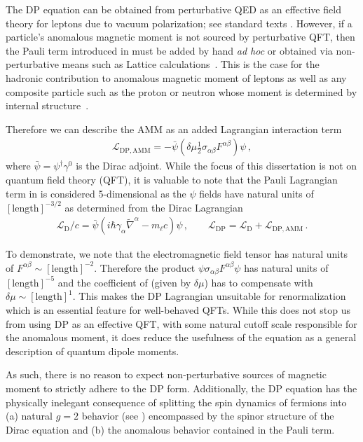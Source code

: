 The DP equation can be obtained from perturbative QED as an effective field theory for leptons due to vacuum polarization; see standard texts \cite{Itzykson:1980rh,Schwartz:2014sze}. However, if a particle's anomalous magnetic moment is not sourced by perturbative QFT, then the Pauli term introduced in  must be added by hand \emph{ad hoc} or obtained via non-perturbative means such as Lattice calculations~\citep{Aoyama:2020ynm}. This is the case for the hadronic contribution to anomalous magnetic moment of leptons as well as any composite particle such as the proton or neutron whose moment is determined by internal structure~\citep{Proceedings:2012ulb,Green:2015wqa}.

Therefore we can describe the AMM as an added Lagrangian interaction term
\begin{gather}
    \label{lamm:1}
    \mathcal{L}_\mathrm{DP,AMM} = -{\bar\psi}\left(\delta\mu\frac{1}{2}\sigma_{\alpha\beta}F^{\alpha\beta}\right)\psi\,,
\end{gather}
where ${\bar\psi}=\psi^{\dagger}\gamma^{0}$ is the Dirac adjoint. While the focus of this dissertation is not on quantum field theory (QFT), it is valuable to note that the Pauli Lagrangian term in  is considered 5-dimensional as the $\psi$ fields have natural units of $[\mathrm{length}]^{-3/2}$ as determined from the Dirac Lagrangian
\begin{gather}
    \label{ld:1}
    \mathcal{L}_\mathrm{D}/c=\bar\psi\left(i\hbar\gamma_{\alpha}\widetilde\nabla^{\alpha}-m_{\ell}c\right)\psi\,,\qquad \mathcal{L}_\mathrm{DP} = \mathcal{L}_\mathrm{D} + \mathcal{L}_\mathrm{DP,AMM}\,.
\end{gather}

To demonstrate, we note that the electromagnetic field tensor has natural units of $F^{\alpha\beta}\sim[\mathrm{length}]^{-2}$. Therefore the product $\psi\sigma_{\alpha\beta}F^{\alpha\beta}\psi$ has natural units of $[\mathrm{length}]^{-5}$ and the coefficient of  (given by $\delta\mu$) has to compensate with $\delta\mu\sim[\mathrm{length}]^{1}$. This makes the DP Lagrangian unsuitable for renormalization which is an essential feature for well-behaved QFTs. While this does not stop us from using DP as an effective QFT, with some natural cutoff scale responsible for the anomalous moment, it does reduce the usefulness of the equation as a general description of quantum dipole moments.

As such, there is no reason to expect non-perturbative sources of magnetic moment to strictly adhere to the DP form. Additionally, the DP equation has the physically inelegant consequence of splitting the spin dynamics of fermions into (a) natural $g\!=\!2$ behavior (see ) encompassed by the spinor structure of the Dirac equation and (b) the anomalous behavior contained in the Pauli term.


